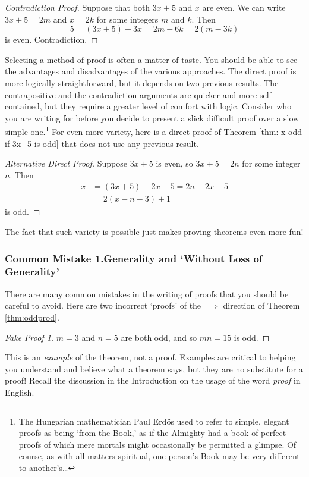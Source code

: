 \begin{proof}[Contradiction Proof] Suppose that both $3x+5$ and $x$ are even. We can write $3x+5=2m$  and $x=2k$ for some integers $m$ and $k$. Then
  \[5= (3x+5)-3x = 2m - 6k=2(m-3k)\]
  is even. Contradiction.
\end{proof}

\noindent Selecting a method of proof is often a matter of taste. You should be able to see the advantages and disadvantages of the various approaches. The direct proof is more logically straightforward, but it depends on two previous results. The contrapositive and the contradiction arguments are quicker and more self-contained, but they require a greater level of comfort with logic. Consider who you are writing for before you decide to present a slick difficult proof over a slow simple one.\footnote{The Hungarian mathematician Paul Erdős used to refer to simple, elegant proofs as being `from the Book,' as if the Almighty had a book of perfect proofs of which mere mortals might occasionally be permitted a glimpse. Of course, as with all matters spiritual, one person's Book may be very different to another's\ldots} For even more variety, here is a direct proof of Theorem \ref{thm: x odd if 3x+5 is odd} that does not use any previous result.

\begin{proof}[Alternative Direct Proof]
Suppose $3x+5$ is even, so $3x+5=2n$ for some integer $n$. Then
\begin{align*}
x&= (3x+5)-2x-5=2n-2x-5\\
&=2(x-n-3)+1
\end{align*}
is odd.
\end{proof} 
The fact that such variety is possible just makes proving theorems even more fun!

\subsubsection*{Common Mistake 1.\quad Generality and `Without Loss of Generality'}

There are many common mistakes in the writing of proofs that you should be careful to avoid. Here are two incorrect `proofs' of the $\implies$ direction of Theorem \ref{thm:oddprod}.

\begin{proof}[Fake Proof 1]
$m=3$ and $n=5$ are both odd, and so $mn=15$ is odd.
\end{proof}

\noindent This is an \emph{example} of the theorem, not a proof. Examples are critical to helping you understand and believe what a theorem says, but they are no substitute for a proof! Recall the discussion in the Introduction on the usage of the word \emph{proof} in English.

